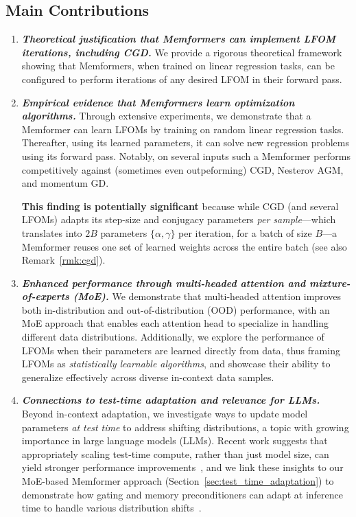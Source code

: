\documentclass[11pt]{article}
\theoremstyle{plain}
\theoremstyle{definition}
\theoremstyle{remark}
\newcommand{\bemph}[1]{\textbf{\emph{#1}}}
\numberwithin{equation}{section}
\begin{document}
\subsection{Main Contributions}
\vspace*{-3pt}
\begin{enumerate}
\setlength{\itemsep}{0pt}
    \item \bemph{Theoretical justification that Memformers can implement LFOM iterations, including CGD.} We provide a rigorous theoretical framework showing that Memformers, when trained on linear regression tasks, can be configured to perform iterations of any desired LFOM in their forward pass. 

    \item \bemph{Empirical evidence that Memformers learn optimization algorithms.} Through extensive experiments, we demonstrate that a Memformer can learn LFOMs by training on random linear regression tasks. Thereafter, using its learned parameters, it can solve new regression problems using its forward pass. Notably, on several inputs such a Memformer performs competitively against (sometimes even outpeforming) CGD, Nesterov AGM, and momentum GD. %

    \textbf{This finding is potentially significant} because while CGD (and several LFOMs) adapts its step-size and conjugacy parameters \emph{per sample}---which translates into \(2B\) parameters \(\{\alpha, \gamma\}\) per iteration, for a batch of size \(B\)---a Memformer reuses one set of learned weights across the entire batch (see also Remark~\ref{rmk:cgd}).

    \item \bemph{Enhanced performance through multi-headed attention and mixture-of-experts (MoE).} We demonstrate that multi-headed attention improves both in-distribution and out-of-distribution (OOD) performance, with an MoE approach that enables each attention head to specialize in handling different data distributions. Additionally, we explore the performance of LFOMs when their parameters are learned directly from data, thus framing LFOMs as \emph{statistically learnable algorithms}, and showcase their ability to generalize effectively across diverse in-context data samples.
    
    \item \bemph{Connections to test-time adaptation and relevance for LLMs.} Beyond in-context adaptation, we investigate ways to update model parameters \emph{at test time} to address shifting distributions, a topic with growing importance in large language models (LLMs). Recent work suggests that appropriately scaling test-time compute, rather than just model size, can yield stronger performance improvements~\citep{snell2024scaling}, and we link these insights to our MoE-based Memformer approach (Section~\ref{sec:test_time_adaptation}) to demonstrate how gating and memory preconditioners can adapt at inference time to handle various distribution shifts~\citep{sun2020test}.

\end{enumerate}
\end{document}

